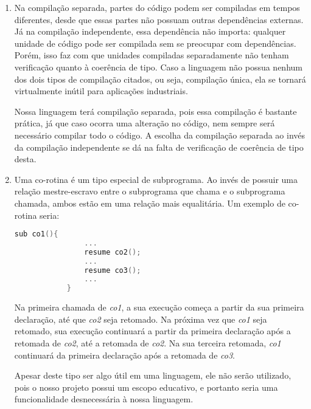 \documentclass[12pt, a4paper]{article}
\begin{document}
\begin{enumerate}
       	\item
        Na compilação separada, partes do código podem ser compiladas em tempos
        diferentes, desde que essas partes não possuam outras dependências
        externas. Já na compilação independente, essa dependência não importa:
        qualquer unidade de código pode ser compilada sem se preocupar com
        dependências. Porém, isso faz com que unidades compiladas separadamente
        não tenham verificação quanto à coerência de tipo. Caso a linguagem não
        possua nenhum dos dois tipos de compilação citados, ou seja, compilação
        única, ela se tornará virtualmente inútil para aplicações industriais.

        Nossa linguagem terá compilação separada, pois essa compilação é
        bastante prática, já que caso ocorra uma alteração no código, nem sempre
        será necessário compilar todo o código. A escolha da compilação
        separada ao invés da compilação independente se dá na falta de
        verificação de coerência de tipo desta.

        \item
        Uma co-rotina é um tipo especial de subprograma. Ao invés de possuir
        uma relação mestre-escravo entre o subprograma que chama e o
        subprograma chamada, ambos estão em uma relação mais equalitária. Um exemplo de co-rotina seria:
        \begin{lstlisting}[language=C]
        	sub co1(){
				...
				resume co2();
				...
				resume co3();
				...
			}
        \end{lstlisting}
		Na primeira chamada de \emph{co1}, a sua execução começa a partir da sua primeira declaração, até que \emph{co2} seja retomado. Na próxima vez que \emph{co1} seja retomado, sua execução continuará a partir da primeira declaração após a retomada de \emph{co2}, até a retomada de \emph{co2}. Na sua terceira retomada, \emph{co1} continuará da primeira declaração após a retomada de \emph{co3}.
       
        Apesar deste tipo ser algo útil em uma linguagem, ele não serão utilizado, pois o nosso projeto possui um escopo educativo, e portanto seria uma funcionalidade desnecessária à nossa linguagem.

    \end{enumerate}
\end{document}
